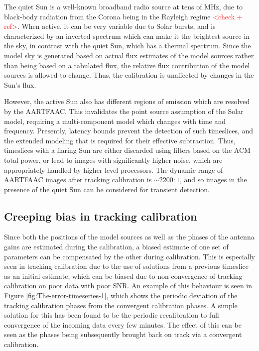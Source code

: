 \documentclass{aa}
\begin{document}
The quiet  Sun is a  well-known broadband  radio source at  tens of MHz,  due to
black-body   radiation  from   the   Corona  being   in   the  Rayleigh   regime
\textcolor{red}{<check  + ref>}. When  active, it  can be  very variable  due to
Solar bursts, and is characterized by an inverted spectrum which can make it the
brightest source in the sky, in contrast with the quiet Sun, which has a thermal
spectrum. Since the model sky is generated based on actual flux estimates of the
model sources  rather than being  based on a  tabulated flux, the  relative flux
contribution of the model sources is allowed to change. Thus, the calibration is
unaffected by changes in the Sun's flux.

However,  the  active Sun  also  has different  regions  of  emission which  are
resolved by  the AARTFAAC. This invalidates  the point source  assumption of the
Solar  model, requiring  a multi-component  model  which changes  with time  and
frequency. Presently,  latency bounds prevent the detection  of such timeslices,
and   the   extended   modeling   that   is   required   for   their   effective
subtraction.  Thus, timeslices  with a  flaring Sun  are either  discarded using
filters  based on  the ACM  total power,  or lead  to images  with significantly
higher noise,  which are appropriately  handled by higher level  processors. The
dynamic range of AARTFAAC images after tracking calibration is $\sim2200:1$, and
so  images in the  presence of  the quiet  Sun can  be considered  for transient
detection.


\subsection{Creeping bias in tracking calibration}

Since both  the positions  of the  model sources as  well as  the phases  of the
antenna gains are estimated during the calibration, a biased estimate of one set
of  parameters can  be  compensated by  the  other during  calibration. This  is
especially  seen in  tracking calibration  due to  the use  of solutions  from a
previous  timeslice  as  an  initial  estimate,  which  can  be  biased  due  to
non-convergence of tracking  calibration on poor data with  poor SNR. An example
of  this behaviour  is  seen in  Figure \ref{fig:The-error-timeseries-1},  which
shows  the  periodic deviation  of  the  tracking  calibration phases  from  the
convergent calibration phases.  A simple solution for this has  been found to be
the periodic  recalibration to full convergence  of the incoming  data every few
minutes.   The effect  of this  can  be seen  as the  phases being  subsequently
brought back on track via a convergent calibration.
\end{document}
